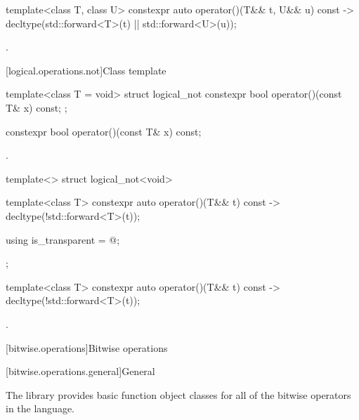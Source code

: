 %
\begin{itemdecl}
template<class T, class U> constexpr auto operator()(T&& t, U&& u) const
    -> decltype(std::forward<T>(t) || std::forward<U>(u));
\end{itemdecl}

\begin{itemdescr}
\pnum
\returns
{}.
\end{itemdescr}

[logical.operations.not]{Class template }

%
\begin{itemdecl}
template<class T = void> struct logical_not {
  constexpr bool operator()(const T& x) const;
};
\end{itemdecl}

%
\begin{itemdecl}
constexpr bool operator()(const T& x) const;
\end{itemdecl}

\begin{itemdescr}
\pnum
\returns
{}.
\end{itemdescr}

%
\begin{itemdecl}
template<> struct logical_not<void> {
  template<class T> constexpr auto operator()(T&& t) const
    -> decltype(!std::forward<T>(t));

  using is_transparent = @\unspec@;
};
\end{itemdecl}

%
\begin{itemdecl}
template<class T> constexpr auto operator()(T&& t) const
    -> decltype(!std::forward<T>(t));
\end{itemdecl}

\begin{itemdescr}
\pnum
\returns
{}.
\end{itemdescr}


[bitwise.operations]{Bitwise operations}

[bitwise.operations.general]{General}

\pnum
The library provides basic function object classes for all of the bitwise
operators in the language.

